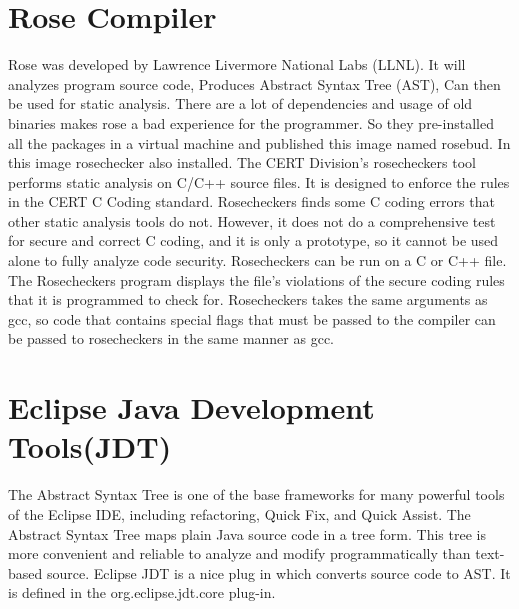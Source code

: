  \section{Rose Compiler}
 
 Rose was developed by Lawrence Livermore National Labs (LLNL). It will analyzes program source code, Produces Abstract Syntax Tree (AST), Can then be used for static analysis. There are a lot of dependencies and usage of old binaries makes rose a bad experience for the programmer. So they pre-installed all the packages in a virtual machine and published this  image named rosebud. In this image rosechecker also installed. The CERT Division's rosecheckers tool performs static analysis on C/C++ source files. It is designed to enforce the rules in the CERT C Coding standard. Rosecheckers finds some C coding errors that other static analysis tools do not. However, it does not do a comprehensive test for secure and correct C coding, and it is only a prototype, so it cannot be used alone to fully analyze code security. 
 Rosecheckers can be run on a C or C++ file. The Rosecheckers program displays the file's violations of the secure coding rules that it is programmed to check for. Rosecheckers takes the same arguments as gcc, so code that contains special flags that must be passed to the compiler can be passed to rosecheckers in the same manner as gcc.\cite{rose} 
 \section{Eclipse Java Development Tools(JDT)}
 The Abstract Syntax Tree is one of the base frameworks for many powerful tools of the Eclipse IDE, including refactoring, Quick Fix, and Quick Assist\cite{EclipseJDT}. The Abstract Syntax Tree maps plain Java source code in a tree form. This tree is more convenient and reliable to analyze and modify programmatically than text-based source. Eclipse JDT is a nice plug in which converts source code to AST. It is defined in the org.eclipse.jdt.core plug-in.
 
